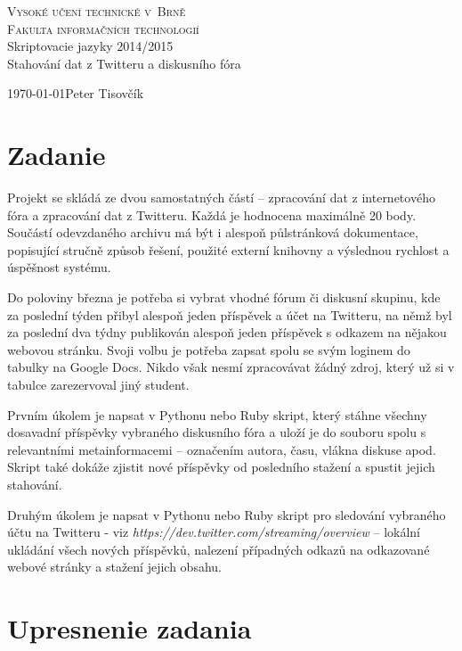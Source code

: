 \documentclass[11pt, a4paper, titlepage] {article}
\begin{document}
\begin{titlepage}
\begin{center}
	{\LARGE\textsc{Vysoké učení technické v~Brně}}\\
\medskip
{\Large\textsc{Fakulta informačních technologií}}\\
{\LARGE Skriptovacie jazyky 2014/2015}\\
\medskip
{\Huge Stahování dat z Twitteru a diskusního fóra}\\
\end{center}
{\Large \today \hfill Peter Tisovčík}
\end{titlepage}

\section{Zadanie}
Projekt se skládá ze dvou samostatných částí -- zpracování dat z internetového fóra a zpracování dat z Twitteru. Každá je hodnocena maximálně 20 body. Součástí odevzdaného archivu má být i alespoň půlstránková dokumentace, popisující stručně způsob řešení, použité externí knihovny a výslednou rychlost a úspěšnost systému.

Do poloviny března je potřeba si vybrat vhodné fórum či diskusní skupinu, kde za poslední týden přibyl alespoň jeden příspěvek a účet na Twitteru, na němž byl za poslední dva týdny publikován alespoň jeden příspěvek s odkazem na nějakou webovou stránku. Svoji volbu je potřeba zapsat spolu se svým loginem do tabulky na Google Docs. Nikdo však nesmí zpracovávat žádný zdroj, který už si v tabulce zarezervoval jiný student.

Prvním úkolem je napsat v Pythonu nebo Ruby skript, který stáhne všechny dosavadní příspěvky vybraného diskusního fóra a uloží je do souboru spolu s relevantními metainformacemi -- označením autora, času, vlákna diskuse apod. Skript také dokáže zjistit nové příspěvky od posledního stažení a spustit jejich stahování.

Druhým úkolem je napsat v Pythonu nebo Ruby skript pro sledování vybraného účtu na Twitteru - viz \emph{https://dev.twitter.com/streaming/overview} -- lokální ukládání všech nových příspěvků, nalezení případných odkazů na odkazované webové stránky a stažení jejich obsahu.


\section{Upresnenie zadania}
\end{document}
